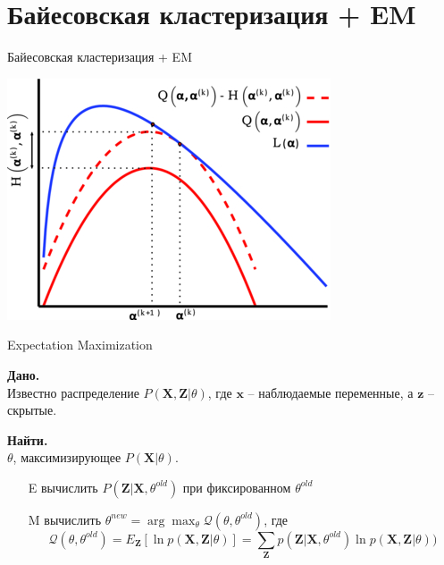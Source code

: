 \documentclass[aspectratio=169]{beamer}
\begin{document}
\section{Байесовская кластеризация + EM}


\begin{frame}

\begin{center}
{\Large Байесовская кластеризация + EM}

\vspace{1em}
\includegraphics[height=0.5\textheight]{images/em.jpg}
\end{center}

\end{frame}

\begin{frame}{Expectation Maximization}

{\bf Дано.} \\ Известно распределение $P(\mathbf{X}, \mathbf{Z} | \theta)$, где $\mathbf{x}$ -- наблюдаемые переменные, а $\mathbf{z}$ -- скрытые.

{\bf Найти.} \\ $\theta$,  максимизирующее $P(\mathbf{X} | \theta)$.

\vspace{1em}
\begin{itemize}
\item[E] вычислить $P(\mathbf{Z} | \mathbf{X}, \theta^{old})$ при фиксированном $\theta^{old}$
\item[M] вычислить $\theta^{new} = \arg \max_{\theta} \mathcal{Q} (\theta, \theta^{old})$, где
\[
\mathcal{Q} (\theta, \theta^{old}) = E_\mathbf{Z}[\ln p(\mathbf{X}, \mathbf{Z} | \theta)] = \sum_{\mathbf{Z}} p(\mathbf{Z} | \mathbf{X}, \theta^{old}) \ln p(\mathbf{X}, \mathbf{Z} | \theta))
\]
\end{itemize}

\end{frame}
\end{document}
